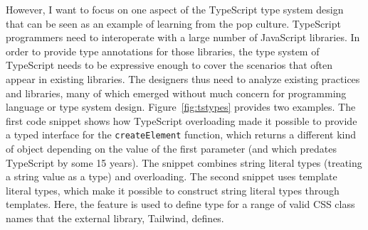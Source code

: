 However, I want to focus on one aspect of the TypeScript type system design that can be seen as an
example of learning from the pop culture. TypeScript programmers need to interoperate with a large
number of JavaScript libraries. In order to provide type annotations for those libraries,
the type system of TypeScript needs to be expressive enough to cover the scenarios that often
appear in existing libraries. The designers thus need to analyze existing practices and libraries,
many of which emerged without much concern for programming language or type system design.
Figure~\ref{fig:tstypes} provides two examples. The first code snippet shows how TypeScript
overloading made it possible to provide a typed interface for the \texttt{createElement} function,
which returns a different kind of object depending on the value of the first parameter
(and which predates TypeScript by some 15 years). The snippet combines string literal types
(treating a string value as a type) and overloading.
The second snippet uses template literal types, which make it possible to construct string literal
types through templates. Here, the feature is used to define type for a range of valid CSS class
names that the external library, Tailwind, defines.


